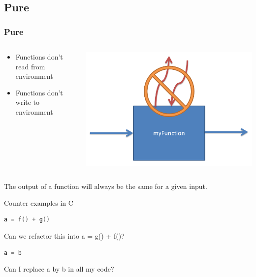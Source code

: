 \documentclass{beamer}
\begin{document}
\subsection{Pure}
\begin{frame}[fragile]
\frametitle{Pure}

 \begin{columns}[]
  \begin{column}[]{5cm}
   \begin{itemize}
    \item Functions don't read from environment
    \item Functions don't write to environment
   \end{itemize}
  \end{column}
  \begin{column}[]{5cm}
    \includegraphics[width=0.8\linewidth]{figs/pure}
  \end{column}
 \end{columns}
 \vspace{0.3cm}
 The output of a function will always be the same for a given input.
 
 \begin{block}{Counter examples in C}
  \begin{lstlisting}[language=C]
    a = f() + g() 
  \end{lstlisting}
  Can we refactor this into a = g() + f()?

  \begin{lstlisting}[language=C]
    a = b 
  \end{lstlisting}
  Can I replace a by b in all my code?

 \end{block}
 
\end{frame}
\end{document}
